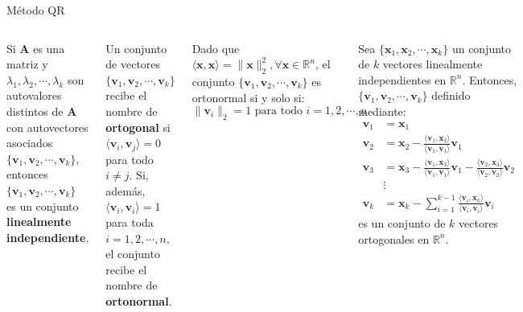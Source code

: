 \documentclass[9pt, aspectratio=169]{beamer}
\begin{document}
\begin{frame}{Método QR}
\begin{columns}[t]
\cx
\begin{theorem}
    Si $\bm{A}$ es una matriz y $\lambda_1, \lambda_2, \cdots, \lambda_k$ son autovalores distintos de $\bm{A}$ con autovectores asociados $\{ \bm{v}_1, \bm{v}_2, \cdots,\bm{v}_k \}$, entonces $\{ \bm{v}_1, \bm{v}_2, \cdots,\bm{v}_k\}$ es un conjunto \textbf{linealmente independiente}.
\end{theorem} \pause

\begin{definition}
    Un conjunto de vectores $\{\bm{v}_1, \bm{v}_2, \cdots,\bm{v}_k\}$ recibe el nombre de \textbf{ortogonal} si $\langle \bm{v}_i, \bm{v}_j \rangle = 0$ para todo $i \neq j$. Si, además, $\langle \bm{v}_i, \bm{v}_i \rangle = 1$ para toda $i = 1, 2, \cdots, n$, el conjunto recibe el nombre de \textbf{ortonormal}.
\end{definition}

Dado que $\langle \bm{x}, \bm{x} \rangle = \lVert \bm{x} \rVert_2^2, \forall \bm{x} \in \mathbb{R}^n$, el conjunto $\{\bm{v}_1, \bm{v}_2, \cdots,\bm{v}_k\}$ es ortonormal si y solo si:\[ \lVert \bm{v}_i \rVert_2 = 1 \text{ para todo } i = 1, 2, \cdots, n \]
\pause

\cx
\begin{theorem}
    Sea $\{ \bm{x}_1, \bm{x}_2, \cdots, \bm{x}_k \}$ un conjunto de $k$ vectores linealmente independientes en $\mathbb{R}^n$. Entonces, $\{ \bm{v}_1, \bm{v}_2, \cdots, \bm{v}_k \}$ definido mediante:
    \begin{align*}
    \bm{v}_1 &= \bm{x}_1 \\
    \bm{v}_2 &= \bm{x}_2 - \frac{\langle \bm{v}_1, \bm{x}_2 \rangle}{\langle \bm{v}_1, \bm{v}_1 \rangle} \bm{v}_1 \\
    \bm{v}_3 &= \bm{x}_3 - \frac{\langle \bm{v}_1, \bm{x}_3 \rangle}{\langle \bm{v}_1, \bm{v}_1 \rangle} \bm{v}_1 - \frac{\langle \bm{v}_2, \bm{x}_3 \rangle}{\langle \bm{v}_2, \bm{v}_2 \rangle} \bm{v}_2\\
             &\vdots \\
    \bm{v}_k &= \bm{x}_k - \sum_{i=1}^{k-1} \frac{\langle \bm{v}_i, \bm{x}_k \rangle}{\langle \bm{v}_i,  \bm{v}_i \rangle} \bm{v}_i
    \end{align*}
    es un conjunto de $k$ vectores ortogonales en $\mathbb{R}^n$.
\end{theorem}
\end{columns}
\end{frame}
\end{document}
